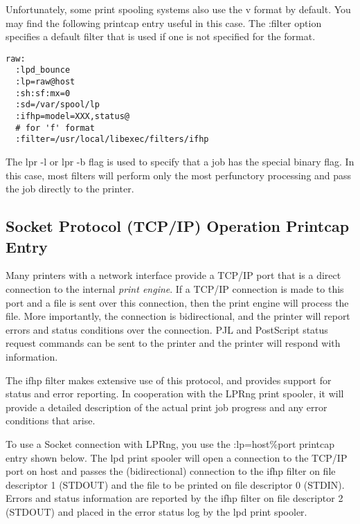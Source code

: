 \documentclass[a4paper]{article}
\begin{document}
Unfortunately,
some print spooling systems also use the {\ttfamily v} format by default.
You may find the following printcap entry useful in this case.
The {\ttfamily :filter} option specifies a default filter that is used
if one is not specified for the format.
\begin{tscreen}
\begin{verbatim}
raw:
  :lpd_bounce
  :lp=raw@host
  :sh:sf:mx=0
  :sd=/var/spool/lp
  :ifhp=model=XXX,status@
  # for 'f' format
  :filter=/usr/local/libexec/filters/ifhp
\end{verbatim}
\end{tscreen}


The {\ttfamily lpr -l} or {\ttfamily lpr -b} flag is used to specify that
a job has the special {\ttfamily binary} flag.
In this case,
most filters will perform only the most perfunctory processing
and pass the job directly to the printer.


\subsection{Socket Protocol (TCP/IP) Operation Printcap Entry
\label{socketpc}}

Many printers with a network interface provide
a TCP/IP port that is a direct connection to the
internal {\itshape print engine\/}.
If a TCP/IP connection is made to this port
and a file is sent over this connection,
then the print engine will process the file.
More importantly,
the connection is bidirectional,
and the printer will report errors and status conditions
over the connection.
PJL and PostScript status request commands can be sent to the printer
and the printer will respond with information.

The {\ttfamily ifhp} filter makes extensive use of this protocol,
and provides support for status and error reporting.
In cooperation with the {\ttfamily LPRng} print spooler,
it will provide a detailed description of the actual print job progress
and any error conditions that arise.

To use a Socket connection with {\ttfamily LPRng},
you use the {\ttfamily :lp=host\%port} printcap entry shown below.
The {\ttfamily lpd} print spooler will open a connection to the
TCP/IP {\ttfamily port} on {\ttfamily host}
and passes the (bidirectional) connection to the {\ttfamily ifhp} filter
on file descriptor 1 ({\ttfamily STDOUT}) and the file to be printed on
file descriptor 0 ({\ttfamily STDIN}).
Errors and status information are reported by the {\ttfamily ifhp} filter
on file descriptor 2 ({\ttfamily STDOUT}) and placed in the error status log by the
{\ttfamily lpd} print spooler.
\end{document}
